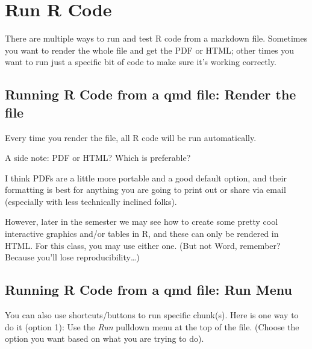 \documentclass[
  letterpaper,
  DIV=11,
  numbers=noendperiod]{scrreprt}
\theoremstyle{remark}
\begin{document}
\section{Run R Code}\label{run-r-code}

There are multiple ways to run and test R code from a markdown file.
Sometimes you want to render the whole file and get the PDF or HTML;
other times you want to run just a specific bit of code to make sure
it's working correctly.

\subsection{Running R Code from a qmd file: Render the
file}\label{running-r-code-from-a-qmd-file-render-the-file}

Every time you render the file, all R code will be run automatically.

A side note: PDF or HTML? Which is preferable?

I think PDFs are a little more portable and a good default option, and
their formatting is best for anything you are going to print out or
share via email (especially with less technically inclined folks).

However, later in the semester we may see how to create some pretty cool
interactive graphics and/or tables in R, and these can only be rendered
in HTML. For this class, you may use either one. (But not Word,
remember? Because you'll lose reproducibility\ldots)

\subsection{Running R Code from a qmd file: Run
Menu}\label{running-r-code-from-a-qmd-file-run-menu}

You can also use shortcuts/buttons to run specific chunk(s). Here is one
way to do it (option 1): Use the \emph{Run} pulldown menu at the top of
the file. (Choose the option you want based on what you are trying to
do).
\end{document}
